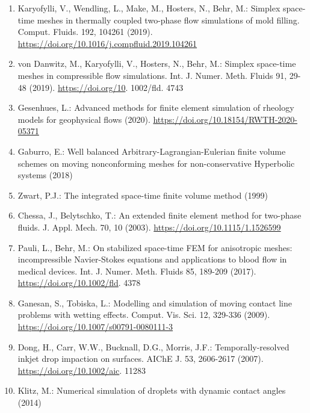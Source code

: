 \documentclass[10pt]{article}
\begin{document}
\begin{enumerate}
  \item Karyofylli, V., Wendling, L., Make, M., Hosters, N., Behr, M.: Simplex space-time meshes in thermally coupled two-phase flow simulations of mold filling. Comput. Fluids. 192, 104261 (2019). \href{https://doi.org/10.1016/j.compfluid.2019.104261}{https://doi.org/10.1016/j.compfluid.2019.104261}

  \item von Danwitz, M., Karyofylli, V., Hosters, N., Behr, M.: Simplex space-time meshes in compressible flow simulations. Int. J. Numer. Meth. Fluids 91, 29-48 (2019). \href{https://doi.org/10}{https://doi.org/10}. 1002/fld. 4743

  \item Gesenhues, L.: Advanced methods for finite element simulation of rheology models for geophysical flows (2020). \href{https://doi.org/10.18154/RWTH-2020-05371}{https://doi.org/10.18154/RWTH-2020-05371}

  \item Gaburro, E.: Well balanced Arbitrary-Lagrangian-Eulerian finite volume schemes on moving nonconforming meshes for non-conservative Hyperbolic systems (2018)

  \item Zwart, P.J.: The integrated space-time finite volume method (1999)

  \item Chessa, J., Belytschko, T.: An extended finite element method for two-phase fluids. J. Appl. Mech. 70, 10 (2003). \href{https://doi.org/10.1115/1.1526599}{https://doi.org/10.1115/1.1526599}

  \item Pauli, L., Behr, M.: On stabilized space-time FEM for anisotropic meshes: incompressible Navier-Stokes equations and applications to blood flow in medical devices. Int. J. Numer. Meth. Fluids 85, 189-209 (2017). \href{https://doi.org/10.1002/fld}{https://doi.org/10.1002/fld}. 4378

  \item Ganesan, S., Tobiska, L.: Modelling and simulation of moving contact line problems with wetting effects. Comput. Vis. Sci. 12, 329-336 (2009). \href{https://doi.org/10.1007/s00791-0080111-3}{https://doi.org/10.1007/s00791-0080111-3}

  \item Dong, H., Carr, W.W., Bucknall, D.G., Morris, J.F.: Temporally-resolved inkjet drop impaction on surfaces. AIChE J. 53, 2606-2617 (2007). \href{https://doi.org/10.1002/aic}{https://doi.org/10.1002/aic}. 11283

  \item Klitz, M.: Numerical simulation of droplets with dynamic contact angles (2014)

\end{enumerate}
\end{document}
